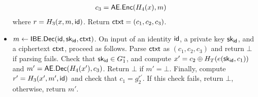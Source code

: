 \begin{itemize}
\begin{align*}
      c_3 &= \textsf{AE.Enc}(H_4(x), m)
    \end{align*}
    where $r = H_3(x, m, \textsf{id})$. Return $\textsf{ctxt} = (c_1, c_2, c_3)$.
  \item $m \gets \textsf{IBE.Dec}(\textsf{id}, \textsf{sk}_{\textsf{id}}, \textsf{ctxt})$. On input of an identity $\textsf{id}$, a private key $\textsf{sk}_{\textsf{id}}$, and a ciphertext $\textsf{ctxt}$, proceed as follows. Parse $\textsf{ctxt}$ as $(c_1, c_2, c_3)$ and return $\bot$ if parsing fails. Check that $\textsf{sk}_{\textsf{id}} \in G_1^*$, and compute $x' = c_2 \oplus H_T( e(\textsf{sk}_{\textsf{id}}, c_1) )$ and $m' = \textsf{AE.Dec}(H_4(x'), c_3)$. Return $\bot$ if $m' = \bot$. Finally, compute $r' = H_3(x', m', \textsf{id})$ and check that $c_1 = g_2^{r'}$. If this check fails, return $\bot$, otherwise, return $m'$.
\end{itemize}